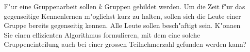 F"ur eine Gruppenarbeit sollen $k$ Gruppen gebildet werden.
Um die Zeit f"ur das gegenseitige Kennenlernen m"oglichst
kurz zu halten, sollen sich die Leute einer Gruppe bereits
gegenseitig kennen. Alle Leute sollen besch"aftigt sein.
K"onnen Sie einen effizienten Algorithmus
formulieren, mit dem eine solche Gruppeneinteilung auch bei
einer grossen Teilnehmerzahl gefunden werden kann?


